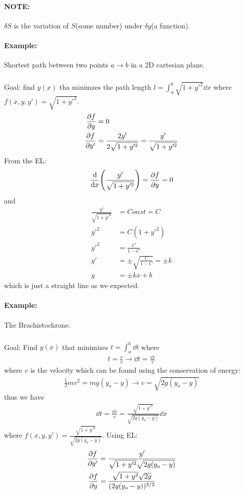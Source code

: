 \documentclass[../main.tex]{subfiles}
\begin{document}
\paragraph*{NOTE:} $\delta S$ is the variation of $S$(some number) under $\delta y$(a function).

\paragraph*{Example:} Shortest path between two points $a \to b$ in a 2D cartesian plane.

\subparagraph*{} Goal: find $y(x)$ tha minimzes the path length $l = \int_a^b \sqrt{1 + y'^2} \dd x$
where $f(x, y, y') = \sqrt{1 + y'^2}$.
\begin{align*}
    \pdv{f}{y} &= 0 \\
    \pdv{f}{y'} &= \frac{2y'}{2\sqrt{1 + y'^2}} = \frac{y'}{\sqrt{1 + y'^2}} \\
\end{align*}
From the EL:
\begin{align*}
    \dv{x}(\frac{y'}{\sqrt{1 + y'^2}}) = \pdv{f}{y} =  0 \\
\end{align*}
and
\begin{align*}
    \frac{y'}{\sqrt{1 + y'^2}} &= Const = C \\
    y'^2 &= C (1 + y'^2) \\
    y'^2 &= \frac{C}{1 - C} \\
    y' &= \pm \sqrt{\frac{C}{1 - C}} = \pm k \\
    y &= \pm kx + b
\end{align*}
which is just a straight line as we expected. 

\paragraph*{Example:} The Brachistochrone. 
\subparagraph*{} Goal: Find $y(x)$ that minimizes $t = \int_a^b \dd t$ where 
\begin{align*}
    t = \frac{s}{v} \to \dd t = \frac{\dd s}{v}
\end{align*}
where $v$ is the velocity which can be found using the conservation of energy:
\begin{align*}
    \frac{1}{2} m v^2 = mg(y_o - y) \to v = \sqrt{2g(y_o - y)}
\end{align*}
thus we have
\begin{align*}
    \dd t = \frac{\dd s}{v} = \frac{\sqrt{1 + y'^2}}{\sqrt{2g(y_o - y)}} \dd x
\end{align*}
where $f(x, y, y') = \frac{\sqrt{1 + y'^2}}{\sqrt{2g(y_o - y)}}$. Using EL:
\begin{align*}
    \pdv{f}{y'} &= \frac{y'}{\sqrt{1 + y'^2}\sqrt{2g(y_o - y)}} \\
    \pdv{f}{y} &= \frac{\sqrt{1 + y^2} \sqrt{2g}}{(2g(y_o - y))^{3/2}} 
\end{align*}
\end{document}

